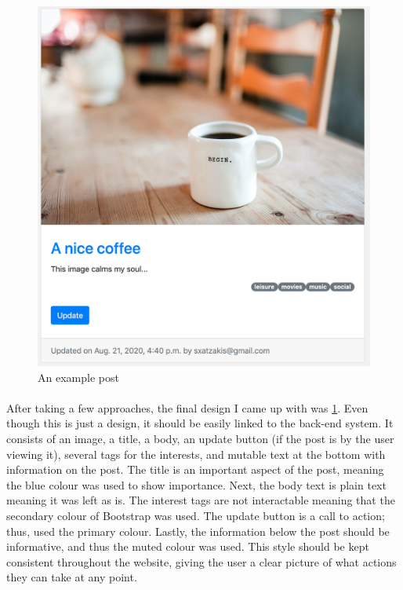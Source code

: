 \begin{figure}[htbp]
\begin{minipage}[t]{0.45\linewidth}
    \includegraphics[width=\linewidth]{Figures/post_example}
    \caption{An example post}
    \label{example_post}
\end{minipage}
\end{figure}

\paragraph{}

After taking a few approaches, the final design I came up with was \ref{example_post}. Even though this is just a design, it should be easily linked to the back-end system. It consists of an image, a title, a body, an update button (if the post is by the user viewing it), several tags for the interests, and mutable text at the bottom with information on the post. The title is an important aspect of the post, meaning the blue colour was used to show importance. Next, the body text is plain text meaning it was left as is. The interest tags are not interactable meaning that the secondary colour of Bootstrap was used. The update button is a call to action; thus, used the primary colour. Lastly, the information below the post should be informative, and thus the muted colour was used. This style should be kept consistent throughout the website, giving the user a clear picture of what actions they can take at any point.

